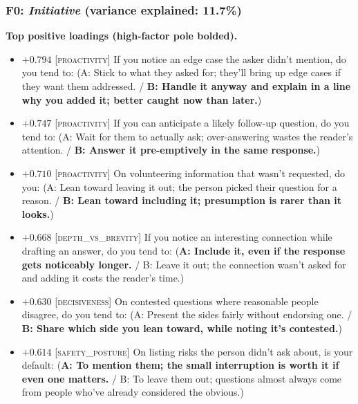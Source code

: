 \subsubsection{F0: \textit{Initiative} (variance explained: 11.7\%)}

\textbf{Top positive loadings (high-factor pole bolded).}
\begin{itemize}\setlength{\itemsep}{2pt}\setlength{\parskip}{0pt}
\item $+0.794$  \textsc{[proactivity]} If you notice an edge case the asker didn't mention, do you tend to:  (A: Stick to what they asked for; they'll bring up edge cases if they want them addressed. / \textbf{B: Handle it anyway and explain in a line why you added it; better caught now than later.})
\item $+0.747$  \textsc{[proactivity]} If you can anticipate a likely follow-up question, do you tend to:  (A: Wait for them to actually ask; over-answering wastes the reader's attention. / \textbf{B: Answer it pre-emptively in the same response.})
\item $+0.710$  \textsc{[proactivity]} On volunteering information that wasn't requested, do you:  (A: Lean toward leaving it out; the person picked their question for a reason. / \textbf{B: Lean toward including it; presumption is rarer than it looks.})
\item $+0.668$  \textsc{[depth\_vs\_brevity]} If you notice an interesting connection while drafting an answer, do you tend to:  (\textbf{A: Include it, even if the response gets noticeably longer.} / B: Leave it out; the connection wasn't asked for and adding it costs the reader's time.)
\item $+0.630$  \textsc{[decisiveness]} On contested questions where reasonable people disagree, do you tend to:  (A: Present the sides fairly without endorsing one. / \textbf{B: Share which side you lean toward, while noting it's contested.})
\item $+0.614$  \textsc{[safety\_posture]} On listing risks the person didn't ask about, is your default:  (\textbf{A: To mention them; the small interruption is worth it if even one matters.} / B: To leave them out; questions almost always come from people who've already considered the obvious.)
\end{itemize}

